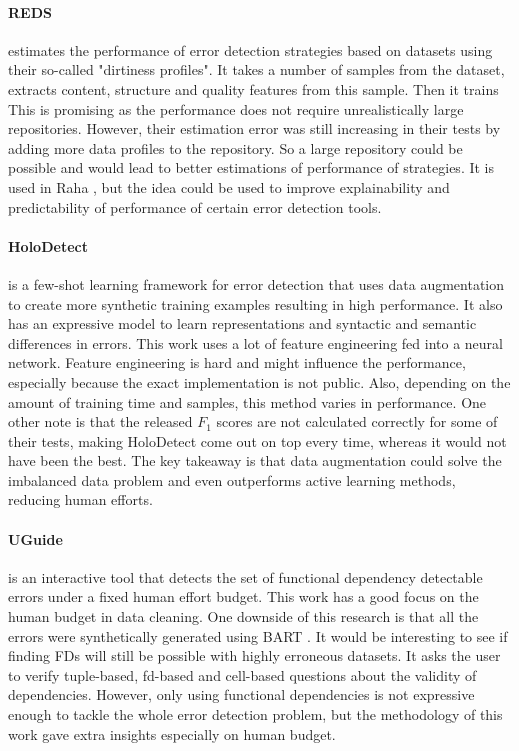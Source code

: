 \paragraph{REDS \cite{Mahdavi2019-pk}} estimates the performance of error detection strategies based on datasets using their so-called "dirtiness profiles". It takes a number of samples from the dataset, extracts content, structure and quality features from this sample. Then it trains 
This is promising as the performance does not require unrealistically large repositories. However, their estimation error was still increasing in their tests by adding more data profiles to the repository.
So a large repository could be possible and would lead to better estimations of performance of strategies.
It is used in Raha \cite{Mahdavi2019-zf}, but the idea could be used to improve explainability and predictability of performance of certain error detection tools.

\paragraph{HoloDetect \cite{Heidari2019-ox}} is a few-shot learning framework for error detection that uses data augmentation to create more synthetic training examples resulting in high performance. It also has an expressive model to learn representations and syntactic and semantic differences in errors. This work uses a lot of feature engineering fed into a neural network. Feature engineering is hard and might influence the performance, especially because the exact implementation is not public. Also, depending on the amount of training time and samples, this method varies in performance. One other note is that the released $F_1$ scores are not calculated correctly for some of their tests, making HoloDetect come out on top every time, whereas it would not have been the best. The key takeaway is that data augmentation could solve the imbalanced data problem and even outperforms active learning methods, reducing human efforts. 

\paragraph{UGuide \cite{Thirumuruganathan2017-ip}} is an interactive tool that detects the set of functional dependency detectable errors under a fixed human effort budget. This work has a good focus on the human budget in data cleaning. One downside of this research is that all the errors were synthetically generated using BART \cite{Arocena2015-om}. It would be interesting to see if finding FDs will still be possible with highly erroneous datasets. It asks the user to verify tuple-based, fd-based and cell-based questions about the validity of dependencies. However, only using functional dependencies is not expressive enough to tackle the whole error detection problem, but the methodology of this work gave extra insights especially on human budget.



